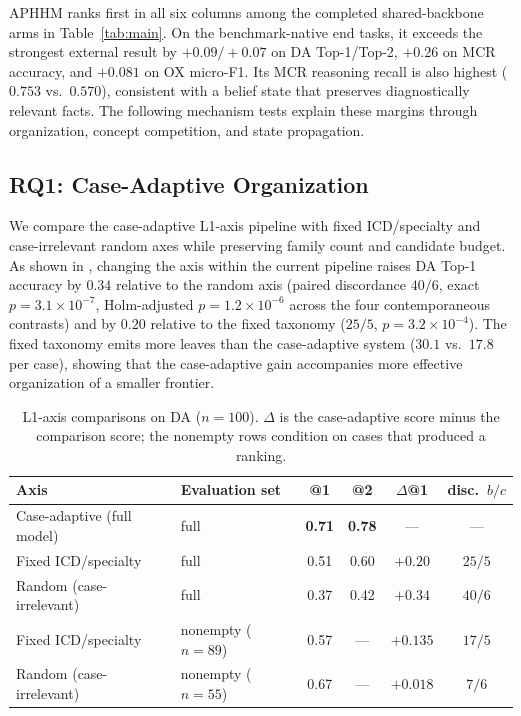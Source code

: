 \documentclass[letterpaper]{article} %
\begin{document}
APHHM ranks first in all six columns among the completed shared-backbone arms in Table~\ref{tab:main}.
On the benchmark-native end tasks, it exceeds the strongest external result by $+0.09/+0.07$ on DA Top-1/Top-2, $+0.26$ on MCR accuracy, and $+0.081$ on OX micro-F1.
Its MCR reasoning recall is also highest ($0.753$ vs.\ $0.570$), consistent with a belief state that preserves diagnostically relevant facts.
The following mechanism tests explain these margins through organization, concept competition, and state propagation.

\subsection{RQ1: Case-Adaptive Organization}
\label{sec:res-org}

We compare the case-adaptive L1-axis pipeline with fixed ICD/specialty and case-irrelevant random axes while preserving family count and candidate budget.
As shown in , changing the axis within the current pipeline raises DA Top-1 accuracy by $0.34$ relative to the random axis (paired discordance $40/6$, exact $p=3.1{\times}10^{-7}$, Holm-adjusted $p=1.2{\times}10^{-6}$ across the four contemporaneous contrasts) and by $0.20$ relative to the fixed taxonomy ($25/5$, $p=3.2{\times}10^{-4}$).
The fixed taxonomy emits more leaves than the case-adaptive system ($30.1$ vs.\ $17.8$ per case), showing that the case-adaptive gain accompanies more effective organization of a smaller frontier.

\begin{table}[t]
\centering
\small
\begin{tabular}{llcccc}
\toprule
Axis & Evaluation set & @1 & @2 & $\Delta$@1 & disc.\ $b/c$ \\
\midrule
Case-adaptive (full model) & full & \textbf{0.71} & \textbf{0.78} & --- & --- \\
Fixed ICD/specialty & full & 0.51 & 0.60 & $+0.20$ & $25/5$ \\
Random (case-irrelevant) & full & 0.37 & 0.42 & $+0.34$ & $40/6$ \\
\midrule
Fixed ICD/specialty & nonempty ($n{=}89$) & 0.57 & --- & $+0.135$ & $17/5$ \\
Random (case-irrelevant) & nonempty ($n{=}55$) & 0.67 & --- & $+0.018$ & $7/6$ \\
\bottomrule
\end{tabular}
\caption{L1-axis comparisons on DA ($n{=}100$). $\Delta$ is the case-adaptive score minus the comparison score; the nonempty rows condition on cases that produced a ranking.}
\label{tab:org-axis}

\end{table}
\end{document}

